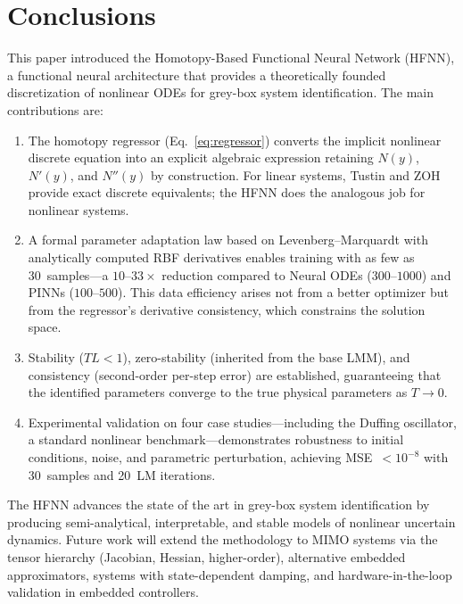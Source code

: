 \documentclass[preprint,12pt]{elsarticle}
\begin{document}
\section{Conclusions}
\label{sec:conclusions}

This paper introduced the Homotopy-Based Functional Neural Network (HFNN), a functional neural architecture that provides a theoretically founded discretization of nonlinear ODEs for grey-box system identification. The main contributions are:

\begin{enumerate}
\item The homotopy regressor (Eq.~\ref{eq:regressor}) converts the implicit nonlinear discrete equation into an explicit algebraic expression retaining $N(y)$, $N'(y)$, and $N''(y)$ by construction. For linear systems, Tustin and ZOH provide exact discrete equivalents; the HFNN does the analogous job for nonlinear systems.

\item A formal parameter adaptation law based on Levenberg--Marquardt with analytically computed RBF derivatives enables training with as few as 30~samples---a $10$--$33\times$ reduction compared to Neural ODEs ($300$--$1000$) and PINNs ($100$--$500$). This data efficiency arises not from a better optimizer but from the regressor's derivative consistency, which constrains the solution space.

\item Stability ($TL < 1$), zero-stability (inherited from the base LMM), and consistency (second-order per-step error) are established, guaranteeing that the identified parameters converge to the true physical parameters as $T \to 0$.

\item Experimental validation on four case studies---including the Duffing oscillator, a standard nonlinear benchmark---demonstrates robustness to initial conditions, noise, and parametric perturbation, achieving MSE~$< 10^{-8}$ with 30~samples and 20~LM iterations.
\end{enumerate}

The HFNN advances the state of the art in grey-box system identification by producing semi-analytical, interpretable, and stable models of nonlinear uncertain dynamics. Future work will extend the methodology to MIMO systems via the tensor hierarchy (Jacobian, Hessian, higher-order), alternative embedded approximators, systems with state-dependent damping, and hardware-in-the-loop validation in embedded controllers.
\end{document}
